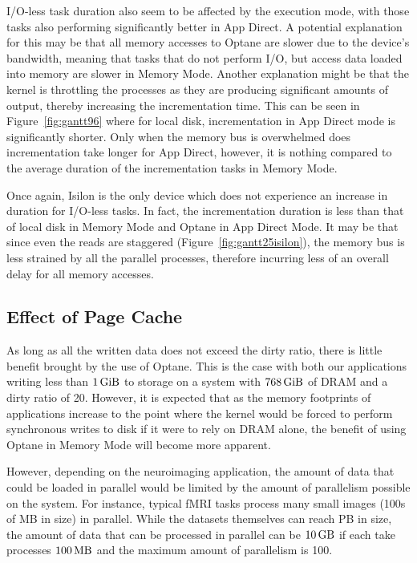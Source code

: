 \documentclass[conference]{IEEEtran}
\begin{document}
I/O-less task duration also seem to be affected by the execution mode, with those tasks
also performing significantly better in App Direct. A potential explanation for this may be 
that all memory accesses to Optane are slower due to the device's bandwidth, meaning that
tasks that do not perform I/O, but access data loaded into memory are slower in Memory Mode. Another explanation might be that the kernel is throttling the processes
as they are producing significant amounts of output, thereby increasing the
incrementation time.
This can be seen in Figure~\ref{fig:gantt96} where for local disk, incrementation in App Direct
mode is significantly shorter. Only when the memory bus is overwhelmed does incrementation take
longer for App Direct, however, it is nothing compared to the average duration of the incrementation
tasks in Memory Mode. 

Once again, Isilon is the only device which does not experience an increase in duration for
I/O-less tasks. In fact, the incrementation duration is less than that of local disk in Memory Mode
and Optane in App Direct Mode. It may be that since even the reads are staggered
(Figure~\ref{fig:gantt25isilon}), the memory bus is less strained by all the parallel processes,
therefore incurring less of an overall delay for all memory accesses.


\subsection{Effect of Page Cache}

As long as all the written data does not exceed the dirty ratio, there is little 
benefit brought by the use of Optane. This is the case with both
our applications writing less than $\SI{1}{\gibi\byte}$ to storage on a system with 
$\SI{768}{\gibi\byte}$ of DRAM and a dirty ratio of 20. However, it is expected 
that as the memory footprints of applications increase to the point where the kernel
would be forced to perform synchronous writes to disk if it were to rely on DRAM alone,
the benefit of using Optane in Memory Mode will become more apparent. 

However, depending on the neuroimaging application, the amount of data that could be
loaded in parallel would be limited by the amount of parallelism possible on the system.
For instance, typical fMRI tasks process many small images (100s of MB in size) in parallel.
While the datasets themselves can reach PB in size, the amount of data that can be processed in
parallel can be $\SI{10}{\giga\byte}$ if each take processes $\SI{100}{\mega\byte}$ and the 
maximum amount of parallelism is 100. 
\end{document}
